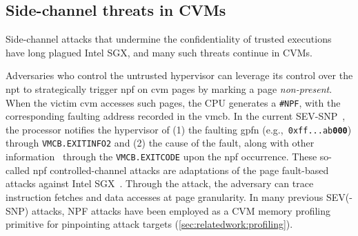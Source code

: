 \subsection{Side-channel threats in CVMs}
\label{sec:background:side-channels}
Side-channel attacks that undermine the confidentiality of trusted executions have long plagued Intel SGX, and many such threats continue in CVMs.


\label{sec:background:controlled-channel}
Adversaries who control the untrusted hypervisor can leverage its control over the \gls{npt} to strategically trigger \gls{npf} on \gls{cvm} pages by marking a page \emph{non-present}.
When the victim \gls{cvm} accesses such pages, the CPU generates a \texttt{\#NPF}, with the corresponding faulting address recorded in the \gls{vmcb}.
In the current SEV-SNP~\cite{amd64}, the processor notifies the hypervisor of (1) the faulting \gls{gpfn} (e.g.,\texttt{ 0xff...ab\textbf{000}}) through {\tt VMCB.EXITINFO2} and (2) the cause of the fault, along with other information~\cite{amd64} through the {\tt VMCB.EXITCODE} upon the \gls{npf} occurrence.
These so-called \gls{npf} controlled-channel attacks are adaptations of the page fault-based attacks against Intel SGX~\cite{xu2015controlledchannel,hahnel_high-resolution_2017}.
Through the attack, the adversary can trace instruction fetches and data accesses at page granularity.
In many previous SEV(-SNP) attacks, NPF attacks have been employed as a CVM memory profiling primitive for pinpointing attack targets (\cref{sec:relatedwork:profiling}).



